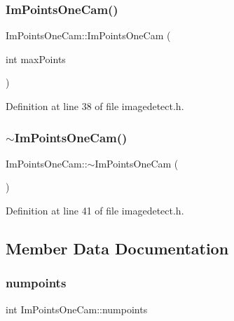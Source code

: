 \subsubsection{\texorpdfstring{ImPointsOneCam()}{ImPointsOneCam()}}
{\footnotesize\ttfamily Im\+Points\+One\+Cam\+::\+Im\+Points\+One\+Cam (\begin{DoxyParamCaption}\item[{int}]{max\+Points }\end{DoxyParamCaption})\hspace{0.3cm}{\ttfamily [inline]}}



Definition at line 38 of file imagedetect.\+h.

\mbox{\label{struct_im_points_one_cam_a7f07e22513b0c58cd4c57bae9b7c5db2}} 
\subsubsection{\texorpdfstring{$\sim$ImPointsOneCam()}{~ImPointsOneCam()}}
{\footnotesize\ttfamily Im\+Points\+One\+Cam\+::$\sim$\+Im\+Points\+One\+Cam (\begin{DoxyParamCaption}{ }\end{DoxyParamCaption})\hspace{0.3cm}{\ttfamily [inline]}}



Definition at line 41 of file imagedetect.\+h.



\subsection{Member Data Documentation}
\mbox{\label{struct_im_points_one_cam_af97c7038c28495424c5d7d982406a243}} 
\subsubsection{\texorpdfstring{numpoints}{numpoints}}
{\footnotesize\ttfamily int Im\+Points\+One\+Cam\+::numpoints}



